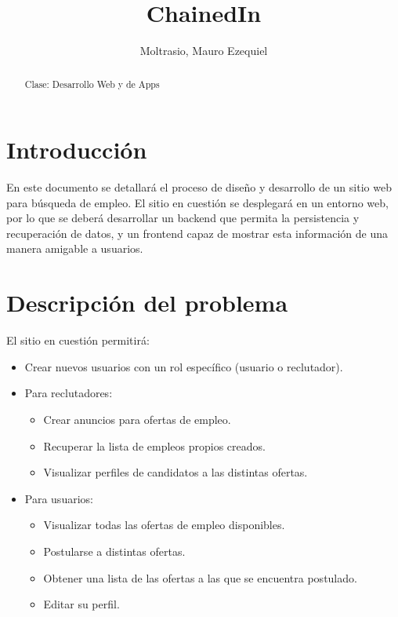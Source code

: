\documentclass[a4paper]{article}
\begin{document}
\title{ChainedIn}
\author{Moltrasio, Mauro Ezequiel}
\date{}
\renewcommand{\abstractname}{\vspace{-\baselineskip}}

\begin{titlingpage}
    \maketitle
    \begin{abstract}
        Clase: Desarrollo Web y de Apps
    \end{abstract}
\end{titlingpage}

\tableofcontents

\section{Introducción}
En este documento se detallará el proceso de diseño y desarrollo de un
sitio web para búsqueda de empleo. El sitio en cuestión se desplegará en
un entorno web, por lo que se deberá desarrollar un backend que permita la
persistencia y recuperación de datos, y un frontend capaz de mostrar esta
información de una manera amigable a usuarios.

\section{Descripción del problema}

El sitio en cuestión permitirá:
\begin{itemize}
    \item Crear nuevos usuarios con un rol específico (usuario o reclutador).
    \item Para reclutadores:
        \begin{itemize}
            \item Crear anuncios para ofertas de empleo.
            \item Recuperar la lista de empleos propios creados.
            \item Visualizar perfiles de candidatos a las distintas ofertas.
        \end{itemize}
    \item Para usuarios:
        \begin{itemize}
            \item Visualizar todas las ofertas de empleo disponibles.
            \item Postularse a distintas ofertas.
            \item Obtener una lista de las ofertas a las que se encuentra postulado.
            \item Editar su perfil.
        \end{itemize}
\end{itemize}
\end{document}
